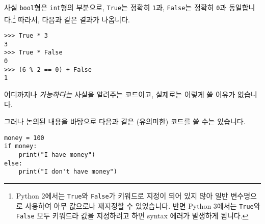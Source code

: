 \documentclass[../main.tex]{subfiles}
\begin{document}
사실 \texttt{bool}형은 \texttt{int}형의 부분으로, \texttt{True}는
정확히 \texttt{1}과, \texttt{False}는 정확히 \texttt{0}과
동일합니다.\footnote{Python 2에서는 \texttt{True}와 \texttt{False}가 키워드로
지정이 되어 있지 않아 일반 변수명으로 사용하여 아무 값으로나 재지정할 수
있었습니다.
반면 Python 3에서는
\texttt{True}와 \texttt{False} 모두 키워드라 값을 지정하려고 하면 syntax 에러가
발생하게 됩니다.} 따라서, 다음과 같은 결과가 나옵니다.
\begin{verbatim}
>>> True * 3
3
>>> True * False
0
>>> (6 % 2 == 0) + False
1
\end{verbatim}
어디까지나 \emph{가능하다는} 사실을 알려주는 코드이고, 실제로는 이렇게 쓸
이유가 없습니다.

그러나 논의된 내용을 바탕으로 다음과 같은 (유의미한) 코드를 쓸 수는 있습니다.
\begin{verbatim}
money = 100
if money:
    print("I have money")
else:
    print("I don't have money")
\end{verbatim}
\end{document}
